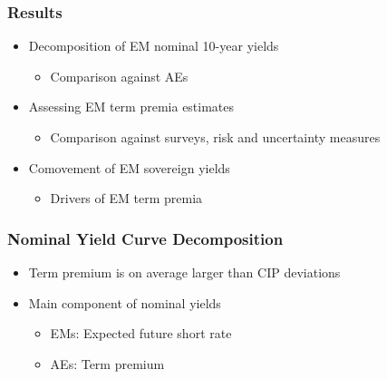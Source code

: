 \documentclass[12pt, aspectratio=169, xcolor=dvipsnames]{beamer}  %
\begin{document}
\begin{frame}
	\frametitle{Results}
	\begin{itemize}
		\item Decomposition of EM nominal 10-year yields
		\begin{itemize}
			\item Comparison against AEs
		\end{itemize}
		\item Assessing EM term premia estimates
		\begin{itemize}
			\item Comparison against surveys, risk and uncertainty measures
		\end{itemize}
		\item Comovement of EM sovereign yields
		\begin{itemize}
			\item Drivers of EM term premia
		\end{itemize}
	\end{itemize}
\end{frame}

\begin{frame}
	\frametitle{Nominal Yield Curve Decomposition}
	
	\begin{itemize}
		\item Term premium is on average larger than CIP deviations
		\item Main component of nominal yields
		\begin{itemize}
			\item EMs: Expected future short rate
			\item AEs: Term premium
		\end{itemize}
	\end{itemize}
\end{frame}
\end{document}
